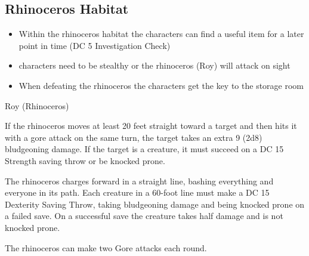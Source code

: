 \subsection*{ Rhinoceros Habitat}
\begin{itemize}
	\item Within the rhinoceros habitat the characters can find a useful item for a later point in time (DC 5 Investigation Check)
	\item characters need to be stealthy or the rhinoceros (Roy) will attack on sight
	\item When defeating the rhinoceros the characters get the key to the storage room
\end{itemize}
\begin{DndMonster}[width=0.5\textwidth]{Roy (Rhinoceros)}

	\DndMonsterBasics[
		armor-class = {17 (Natural Armor)},
		hit-points  = {\DndDice{20d10 + 40}},
		speed       = {40 ft.},
	]

	\renewcommand{\AbilityScoreSpacer}{~}

	\DndMonsterAbilityScores[
		str = 21,
		dex = 8,
		con = 15,
		int = 2,
		wis = 12,
		cha = 6,
	]

	\DndMonsterDetails[
		skills = {Perception +1},
		senses = {passive Perception 11},
		languages = {Common},
		challenge = 6,
	]

	If the rhinoceros moves at least 20 feet straight toward a target and then hits it with a gore attack on the same turn, the target takes an extra 9 (2d8) bludgeoning damage. If the target is a creature, it must succeed on a DC 15 Strength saving throw or be knocked prone.
	
	 The rhinoceros charges forward in a straight line, bashing everything and everyone in its path. Each creature in a 60-foot line must make a DC 15 Dexterity Saving Throw, taking  bludgeoning damage and being knocked prone on a failed save. On a successful save the creature takes half damage and is not knocked prone.
	
	The rhinoceros can make two Gore attacks each round.
	
	\DndMonsterAttack[
		name=Gore,
		distance=melee, %
		mod=+7,
		reach=5,
		targets=one target,
		dmg={\DndDice{2d8 + 5}},
		dmg-type=piercing,
	]
\end{DndMonster}

